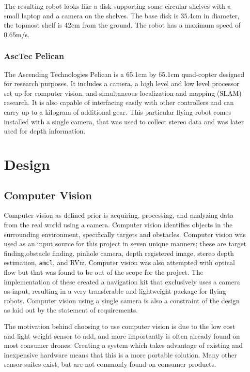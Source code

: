 \documentclass{article}[12]
\begin{document}
		The resulting robot looks like a disk supporting some circular shelves with a small laptop and a camera on the shelves. The base disk is 35.4cm in diameter, the topmost shelf is 42cm from the ground. The robot has a maximum speed of 0.65m/s. 
		
		\subsubsection{AscTec Pelican}
		
		The Ascending Technologies Pelican is a 65.1cm by 65.1cm quad-copter designed for research purposes.\cite{asctec} It includes a camera, a high level and low level processor set up for computer vision, and simultaneous localization and mapping (SLAM) research. It is also capable of interfacing easily with other controllers and can carry up to a kilogram of additional gear. This particular flying robot comes installed with a single camera, that was used to collect stereo data and was later used for depth information.

		
\section{Design}
	
	\subsection{Computer Vision}
	
	Computer vision as defined prior is acquiring, processing, and analyzing data from the real world using a camera. Computer vision identifies objects in the surrounding environment, specifically targets and obstacles. Computer vision was used as an input source for this project in seven unique manners; these are target finding,obstacle finding, pinhole camera, depth registered image, stereo depth estimation, \texttt{amcl}, and RViz. Computer vision was also attempted with optical flow but that was found to be out of the scope for the project. The implementation of these created a navigation kit that exclusively uses a camera as input, resulting in a very transferable and lightweight package for flying robots. Computer vision using a single camera is also a constraint of the design as laid out by the statement of requirements. \cite{sor}
	
	The motivation behind choosing to use computer vision is due to the low cost and light weight sensor to add, and more importantly is often already found on most consumer drones. Creating a system which takes advantage of existing and inexpensive hardware means that this is a more portable solution. Many other sensor suites exist, but are not commonly found on consumer products.
\end{document}
